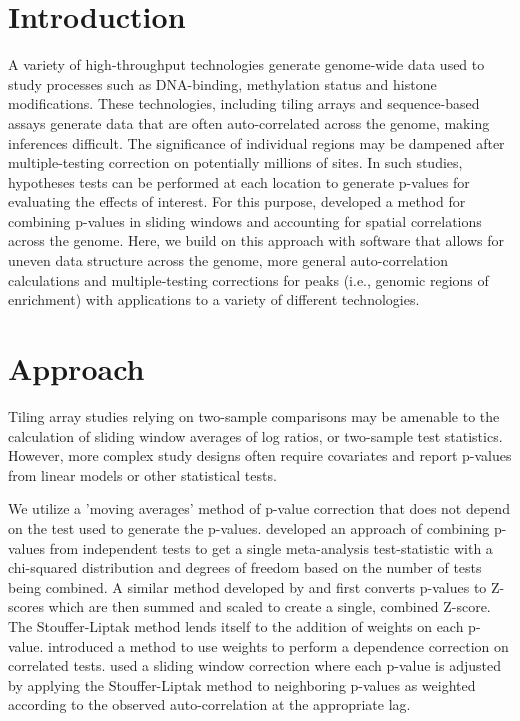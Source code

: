 \documentclass{bioinfo}
\begin{document}
\section{Introduction}
A variety of high-throughput technologies generate
genome-wide data used to study processes such as DNA-binding, methylation
status and histone modifications. These technologies, including tiling
arrays and sequence-based assays generate data
that are often auto-correlated across
the genome, making inferences difficult. The significance of
individual regions may be dampened after multiple-testing correction
on potentially millions of sites.
In such studies, hypotheses tests can be performed at each location to
generate p-values for evaluating the effects of interest. For this
purpose, \cite{Kechris2010} developed a method for combining p-values
in sliding windows and accounting for spatial correlations across the
genome. Here, we build on this approach with software
that allows for uneven data structure across the genome, more general
auto-correlation calculations and multiple-testing corrections for peaks
(i.e., genomic regions of enrichment) with applications to a variety of
different technologies.

\section{Approach}
Tiling array studies relying on two-sample comparisons may be
amenable to the calculation of sliding window averages of log ratios,
or two-sample test statistics. However,
more complex study designs often require covariates and report
p-values from linear models or other statistical tests.

We utilize a 'moving averages' method of p-value correction that
does not depend on the test used to generate the p-values. \cite{Fisher}
developed an approach of combining p-values from independent tests to
get a single meta-analysis test-statistic with a chi-squared
distribution and degrees of freedom based on the number of tests being
combined.  A similar method developed by \cite{Stouffer} and
\cite{Liptak} first converts p-values to Z-scores which are then summed
and scaled to create a single, combined Z-score.  The Stouffer-Liptak
method lends itself to the addition of weights on each p-value.
\cite{Zaykin2002} introduced a method to use weights to perform a
dependence correction on correlated tests. \cite{Kechris2010} used
a sliding window correction where each p-value is
adjusted by applying the Stouffer-Liptak method to neighboring p-values
as weighted according to the observed auto-correlation at the
appropriate lag.
\end{document}
